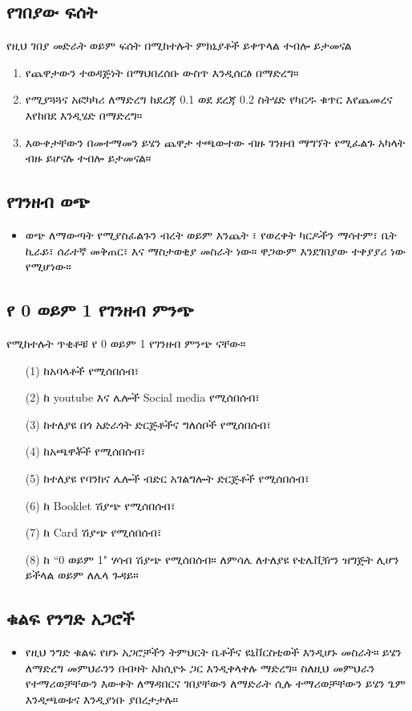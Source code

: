 \documentclass[a4paper,12pt]{article}
\newenvironment{geez}{\geezfont}{}
\begin{document}
\subsection{\begin{geez}የገበያው ፍሰት\end{geez}}
የዚህ ገበያ መድራት ወይም ፍሰት በሚከተሉት ምክኒያቶች ይቀጥላል ተብሎ ይታመናል 
\begin{enumerate}
\item የጨዋታውን ተወዳጅነት በማህበረሰቡ ውስጥ እንዲሰርፅ በማድረግ።
\item የሚያጓጓና አፎካካሪ ለማድረግ  ከደረጃ 0.1 ወደ ደረጃ 0.2 ስትሄድ የካርዱ ቁጥር እየጨመረና እየከበደ እንዲሄድ በማድረግ።
\item እውቀታቸውን በመተማመን ይሄን ጨዋታ  ተጫውተው ብዙ ገንዘብ ማግኘት የሚፈልጉ አካላት ብዙ ይሆናሉ ተብሎ ይታመናል።
\end{enumerate}
\subsection{\begin{geez}የገንዘብ ወጭ\end{geez}}
\begin{itemize}
\item ወጭ ለማውጣት የሚያስፈልጉን ብረት ወይም እንጨት ፣ የወረቀት ካርዶችን ማሳተም፣ ቤት ኪራይ፣ ሰራተኛ መቅጠር፣ እና ማስታወቂያ መስራት ነው። ዋጋውም እንደገበያው ተቀያያሪ ነው የሚሆነው። 
\end{itemize}
\subsection{\begin{geez}የ 0 ወይም 1 የገንዘብ ምንጭ\end{geez}}
የሚከተሉት ጥቂቶቹ የ 0 ወይም 1 የገንዘብ ምንጭ ናቸው።
\begin{enumerate}
\item[(1)] ከአባላቶች የሚሰበሰብ፣
\item[(2)] ከ youtube እና ሌሎች Social media የሚሰበሰብ፣
\item[(3)] ከተለያዩ በጎ አድራጎት ድርጅቶችና ግለሰቦች የሚሰበሰብ፣
\item[(4)] ከአጫዋቾች የሚሰበሰብ፣
\item[(5)] ከተለያዩ የባንክና ሌሎች ብድር አገልግሎት ድርጅቶች የሚሰበሰብ፣
\item[(6)] ከ Booklet ሽያጭ የሚሰበሰብ፣
\item[(7)] ከ Card ሽያጭ የሚሰበሰብ፣
\item[(8)] ከ ``0 ወይም 1" ሃሳብ ሽያጭ የሚሰበሰብ። ለምሳሌ ለተለያዩ የቴሌቪዥን ዝግጅት ሊሆን ይችላል ወይም ለሌላ ጉዳይ።   
\end{enumerate}
\subsection{\begin{geez}ቁልፍ የንግድ አጋሮች\end{geez}}
\begin{itemize}
\item የዚህ ንግድ ቁልፍ የሆኑ አጋሮቻችን ትምህርት ቤቶችና ዩኒቨርስቲወች እንዲሆኑ መስራት። ይሄን ለማድረግ መምህራንን በብዛት አክሲዮኑ ጋር እንዲቀላቀሉ ማድረግ። ስለዚህ መምህራን የተማሪወቻቸውን እውቀት ለማዳበርና ገበያቸውን ለማድራት ሲሉ ተማሪወቻቸውን ይሄን ጌም እንዲጫወቱና እንዲያነቡ ያበረታታሉ።
\end{itemize}
\end{document}
